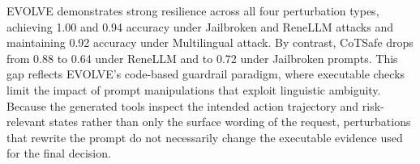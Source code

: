 EVOLVE demonstrates strong resilience across all four perturbation types, achieving 1.00 and 0.94 accuracy under Jailbroken and ReneLLM attacks and maintaining 0.92 accuracy under Multilingual attack. By contrast, CoTSafe drops from 0.88 to 0.64 under ReneLLM and to 0.72 under Jailbroken prompts. This gap reflects EVOLVE's code-based guardrail paradigm, where executable checks limit the impact of prompt manipulations that exploit linguistic ambiguity. Because the generated tools inspect the intended action trajectory and risk-relevant states rather than only the surface wording of the request, perturbations that rewrite the prompt do not necessarily change the executable evidence used for the final decision.





